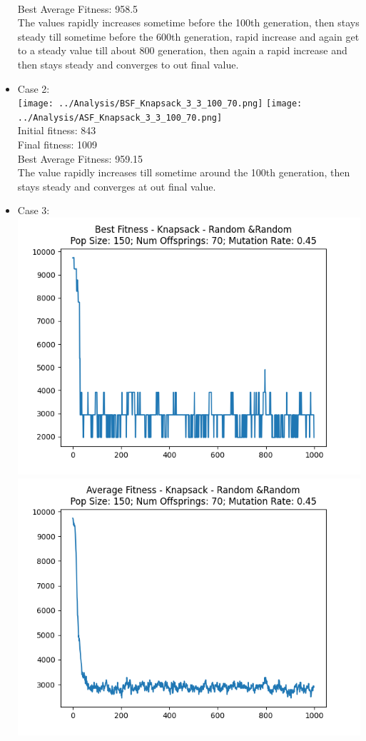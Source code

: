\documentclass[12pt]{report} %
\begin{document}
\begin{itemize}
	      \\Best Average Fitness: 958.5
	      \\The values rapidly increases sometime before the 100th generation, then stays steady till sometime before the 600th generation, rapid increase and again get to a steady value till about 800 generation, then again a rapid increase and then stays steady and converges to out final value.
	\item Case 2:\\
	      \texttt{[image: ../Analysis/BSF\_Knapsack\_3\_3\_100\_70.png]}
	      \texttt{[image: ../Analysis/ASF\_Knapsack\_3\_3\_100\_70.png]}
	      \\Initial fitness:  843
	      \\Final fitness:  1009
	      \\Best Average Fitness: 959.15
	      \\The value rapidly increases till sometime around the 100th generation, then stays steady and converges at out final value.
	\item Case 3:\\
	      \includegraphics[scale=0.5]{../Analysis/BSF_Knapsack_4_4_150_70.png}
	      \includegraphics[scale=0.5]{../Analysis/ASF_Knapsack_4_4_150_70.png}

\end{itemize}
\end{document}
